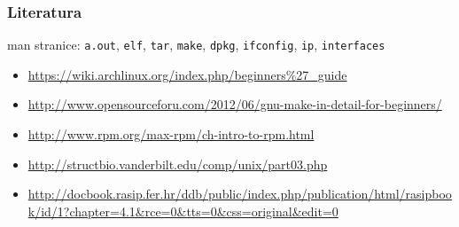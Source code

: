 \documentclass[table,usenames,dvipsnames]{beamer}
\newcommand{\shell}[1]{\texttt{#1}}
\begin{document}
\begin{frame}[t]
	\frametitle{Literatura}
	man stranice: \shell{a.out}, \shell{elf}, \shell{tar}, \shell{make}, \shell{dpkg}, \shell{ifconfig}, \shell{ip}, \shell{interfaces}
	
	\begin{itemize}
		\item \url{https://wiki.archlinux.org/index.php/beginners\%27_guide}
		\item
		\url{http://www.opensourceforu.com/2012/06/gnu-make-in-detail-for-beginners/}
		\item \url{http://www.rpm.org/max-rpm/ch-intro-to-rpm.html}
		\item \url{http://structbio.vanderbilt.edu/comp/unix/part03.php}
		\item \url{http://docbook.rasip.fer.hr/ddb/public/index.php/publication/html/rasipbook/id/1?chapter=4.1&rce=0&tts=0&css=original&edit=0}
	\end{itemize}
\end{frame}
	
\end{document}
